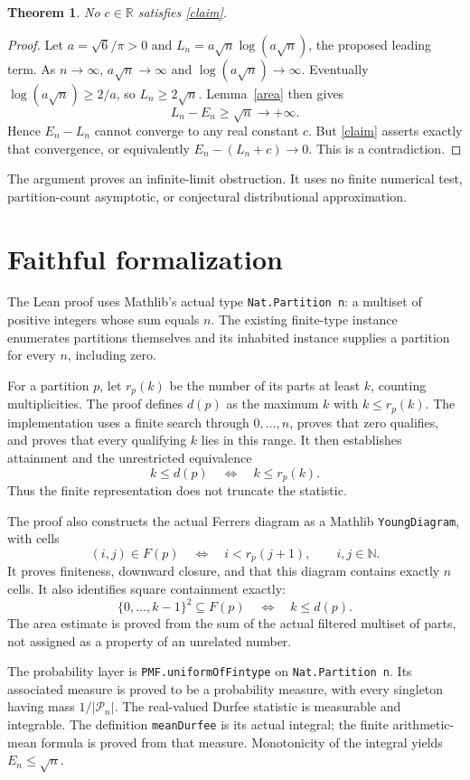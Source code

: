 \documentclass[10pt]{article}
\newtheorem{theorem}{Theorem}
\begin{document}
\begin{theorem}
No $c\in\mathbb R$ satisfies \eqref{claim}.
\end{theorem}
\begin{proof}
Let $a=\sqrt6/\pi>0$ and $L_n=a\sqrt n\log(a\sqrt n)$, the proposed leading term. As $n\to\infty$, $a\sqrt n\to\infty$ and $\log(a\sqrt n)\to\infty$. Eventually $\log(a\sqrt n)\ge2/a$, so $L_n\ge2\sqrt n$. Lemma~\ref{area} then gives
\[
 L_n-E_n\ge\sqrt n\longrightarrow+\infty.
\]
Hence $E_n-L_n$ cannot converge to any real constant $c$. But \eqref{claim} asserts exactly that convergence, or equivalently $E_n-(L_n+c)\to0$. This is a contradiction.
\end{proof}
The argument proves an infinite-limit obstruction. It uses no finite numerical test, partition-count asymptotic, or conjectural distributional approximation.

\clearpage
\section{Faithful formalization}
The Lean proof uses Mathlib's actual type \texttt{Nat.Partition n}: a multiset of positive integers whose sum equals $n$. The existing finite-type instance enumerates partitions themselves and its inhabited instance supplies a partition for every $n$, including zero.

For a partition $p$, let $r_p(k)$ be the number of its parts at least $k$, counting multiplicities. The proof defines $d(p)$ as the maximum $k$ with $k\le r_p(k)$. The implementation uses a finite search through $0,\ldots,n$, proves that zero qualifies, and proves that every qualifying $k$ lies in this range. It then establishes attainment and the unrestricted equivalence
\[
 k\le d(p)\quad\Longleftrightarrow\quad k\le r_p(k).
\]
Thus the finite representation does not truncate the statistic.

The proof also constructs the actual Ferrers diagram as a Mathlib \texttt{YoungDiagram}, with cells
\[
 (i,j)\in F(p)\quad\Longleftrightarrow\quad i<r_p(j+1),
 \qquad i,j\in\mathbb N.
\]
It proves finiteness, downward closure, and that this diagram contains exactly $n$ cells. It also identifies square containment exactly:
\[
 \{0,\ldots,k-1\}^2\subseteq F(p)
 \quad\Longleftrightarrow\quad k\le d(p).
\]
The area estimate is proved from the sum of the actual filtered multiset of parts, not assigned as a property of an unrelated number.

The probability layer is \texttt{PMF.uniformOfFintype} on \texttt{Nat.Partition n}. Its associated measure is proved to be a probability measure, with every singleton having mass $1/|\mathcal P_n|$. The real-valued Durfee statistic is measurable and integrable. The definition \texttt{meanDurfee} is its actual integral; the finite arithmetic-mean formula is proved from that measure. Monotonicity of the integral yields $E_n\le\sqrt n$.
\end{document}
